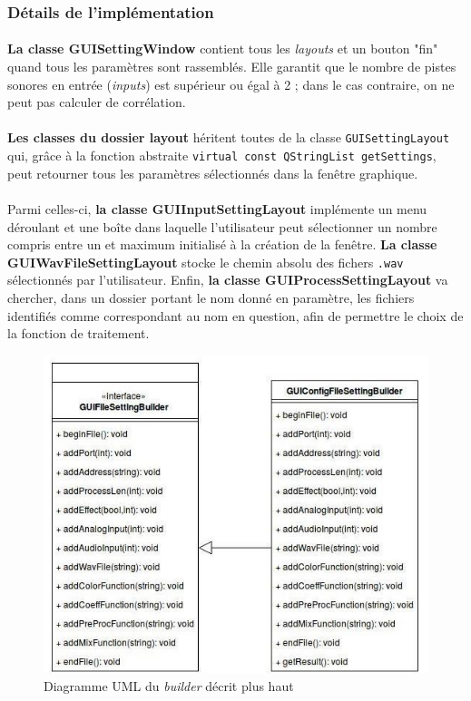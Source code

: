  \subsubsection{Détails de l'implémentation}
 \paragraph{}
 \textbf{La classe GUISettingWindow} contient tous les
 \textit{layouts} et un bouton "fin" quand tous les paramètres sont
 rassemblés. Elle garantit que le nombre de pistes sonores en entrée
 (\textit{inputs}) est supérieur ou égal à 2 ; dans le cas contraire,
 on ne peut pas calculer de corrélation.
 \paragraph{}
 \textbf{Les classes du dossier layout} héritent toutes de la classe
 \verb!GUISettingLayout! qui, grâce à la fonction abstraite
 \verb!virtual const QStringList getSettings!, peut retourner tous les
 paramètres sélectionnés dans la fenêtre graphique.
 \paragraph{}
 Parmi celles-ci, \textbf{la classe GUIInputSettingLayout} implémente
 un menu déroulant et une boîte dans laquelle l'utilisateur peut
 sélectionner un nombre compris entre un et maximum initialisé à la
 création de la fenêtre. \textbf{La classe GUIWavFileSettingLayout}
 stocke le chemin absolu des fichers \verb!.wav! sélectionnés par
 l'utilisateur. Enfin, \textbf{la classe GUIProcessSettingLayout} va
 chercher, dans un dossier portant le nom donné en paramètre, les
 fichiers identifiés comme correspondant au nom en question, afin de
 permettre le choix de la fonction de traitement.

 \begin{figure}[h]
  \centering
  \includegraphics[scale=0.5]{assets/umlBuilder.png}
  \caption{Diagramme UML du \textit{builder} décrit plus haut}
  \label{schéma global}
 \end{figure}

